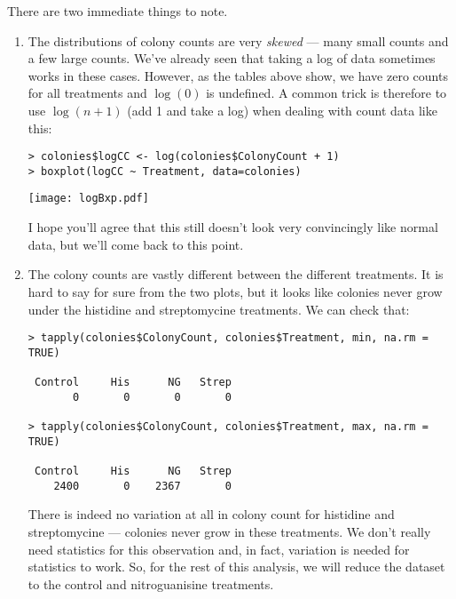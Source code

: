 There are two immediate things to note. 
\begin{enumerate}

	\item The distributions of colony counts are very {\it skewed} --- 
	many small counts and a few large counts. We've already seen that 
	taking a log of data sometimes works in these cases. However, as the 
	tables above show, we have zero counts for all treatments and 
	$\log(0)$ is undefined. A common trick is therefore to use 
	$\log(n+1)$ (add 1 and take a log) when dealing with count data like 
	this:

\begin{lstlisting}
> colonies$logCC <- log(colonies$ColonyCount + 1)
> boxplot(logCC ~ Treatment, data=colonies)
\end{lstlisting}

\begin{center}
	\texttt{[image: logBxp.pdf]} 
\end{center}

I hope you'll agree that this still doesn't look very convincingly like 
normal data, but we'll come back to this point. 

	\item The colony counts are vastly different between the different 
	treatments. It is hard to say for sure from the two plots, but it looks 
	like colonies never grow under the histidine and streptomycine 
	treatments. We can check that:

\begin{lstlisting}
> tapply(colonies$ColonyCount, colonies$Treatment, min, na.rm = TRUE)

 Control     His      NG   Strep 
       0       0       0       0 

> tapply(colonies$ColonyCount, colonies$Treatment, max, na.rm = TRUE)

 Control     His      NG   Strep 
    2400       0    2367       0 
\end{lstlisting}

There is indeed no variation at all in colony count for histidine and 
streptomycine --- colonies never grow in these treatments. We don't 
really need statistics for this observation and, in fact, variation is 
needed for statistics to work. So, for the rest of this analysis, we 
will reduce the dataset to the control and nitroguanisine treatments. 

\end{enumerate}

